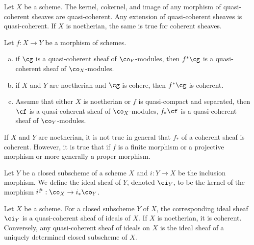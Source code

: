 \begin{prop}
Let $X$ be a scheme. The kernel, cokernel, and image of any morphism of quasi-coherent sheaves are quasi-coherent. Any extension of quasi-coherent sheaves is quasi-coherent. If $X$ is noetherian, the same is true for coherent sheaves. 
\end{prop}


\begin{prop}
Let $f: X \to Y$ be a morphism of schemes. 
	\begin{enumerate}[(a)]
	\item if $\cg$ is a quasi-coherent sheaf of $\co_Y$-modules, then $f^*\cg$ is a quasi-coherent sheaf of $\co_X$-modules.
	\item if $X$ and $Y$ are noetherian and $\cg$ is cohere, then $f^*\cg$ is coherent.
	\item Assume that either $X$ is noetherian or $f$ is quasi-compact and separated, then $\cf$ is a quasi-coherent sheaf of $\co_X$-modules, $f_*\cf$ is a quasi-coherent sheaf of $\co_Y$-modules.
	\end{enumerate}
\end{prop}


\begin{rem}
If $X$ and $Y$ are noetherian, it is not true in general that $f_*$ of a coherent sheaf is coherent. However, it is true that if $f$ is a finite morphism or a projective morphism or more generally a proper morphism. 
\end{rem}


\begin{dfn}
Let $Y$ be a closed subscheme of a scheme $X$ and $i: Y \to X$ be the inclusion morphism. We define the ideal sheaf of $Y$, denoted $\ci_Y$, to be the kernel of the morphism $i^\#: \co_X \to i_* \co_Y$. 
\end{dfn}


\begin{prop}
Let $X$ be a scheme. For a closed subscheme $Y$ of $X$, the corresponding ideal sheaf $\ci_Y$ is a quasi-coherent sheaf of ideals of $X$. If $X$ is noetherian, it is coherent. Conversely, any quasi-coherent sheaf of ideals on $X$ is the ideal sheaf of a uniquely determined closed subscheme of $X$.
\end{prop}


